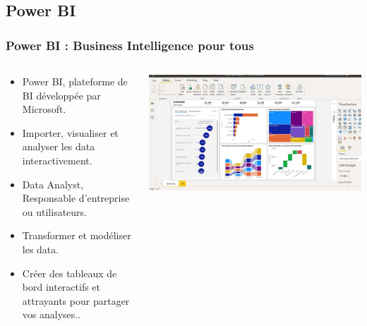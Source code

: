\documentclass{beamer}
\begin{document}
\subsection{Power BI}
\begin{frame}
	\frametitle{Power BI : Business Intelligence pour tous}
	
	\begin{columns}[T] %
		\begin{column}{0.5\textwidth}
			\begin{itemize}
				\item Power BI, plateforme de BI développée par Microsoft.
				\item Importer, visualiser et analyser les data  interactivement.
				\item Data Analyst, Responsable d'entreprise ou utilisateurs.
				\item Transformer et modéliser les data.
				\item Créer des tableaux de bord interactifs et attrayants pour partager vos analyses..
			\end{itemize}
		\end{column}
		\begin{column}{0.5\textwidth}
			\begin{center}
				\includegraphics[width=\textwidth]{power-bi-data.jpg}
			\end{center}
		\end{column}
	\end{columns}
	
\end{frame}
\end{document}
